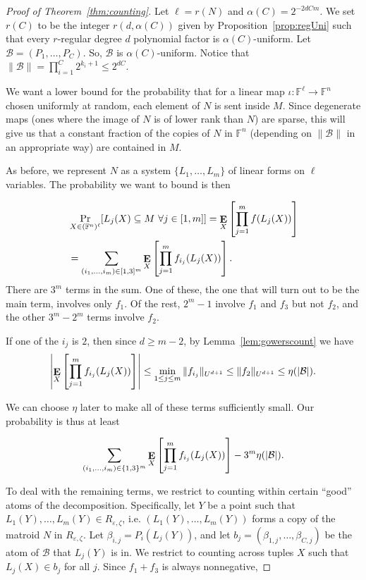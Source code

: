 \documentclass{article}
\theoremstyle{plain}
\theoremstyle{definition}
\theoremstyle{definition}
\theoremstyle{remark}
\numberwithin{equation}{section}
\newcommand{\FF}{\mathbb{F}}
\newcommand{\Esymb}{{\bf E}}
\DeclareMathOperator*{\E}{\Esymb}
\newcommand{\cB}{\mathcal B}
\begin{document}
\begin{proof}[Proof of Theorem~\ref{thm:counting}]
Let $\ell=r(N)$ and $\alpha(C)=2^{-2dCm}$. We set $r(C)$ to be the integer $r(d,\alpha(C))$ given by Proposition~\ref{prop:regUni} such that every $r$-regular degree $d$ polynomial factor is $\alpha(C)$-uniform. Let $\cB=(P_1,\dots,P_C)$. So, $\cB$ is $\alpha(C)$-uniform. Notice that $\|\cB\|=\prod_{i=1}^C 2^{k_i+1}\leq 2^{dC}$. 

We want a lower bound for the probability that for a linear map $\iota:\FF^\ell\to \FF^n$ chosen uniformly at random, each element of $N$ is sent inside $M$. Since degenerate maps (ones where the image of $N$ is of lower rank than $N$) are sparse, this will give us that a constant fraction of the copies of $N$ in $\FF^n$ (depending on $\|\cB\|$ in an appropriate way) are contained in $M$.

As before, we represent $N$ as a system $\{L_1,\dots,L_m\}$ of linear forms on $\ell$ variables. The probability we want to bound is then

\begin{align*}
    &\Pr_{X\in (\FF^{n})^\ell}[L_j(X)\subseteq M ~ \forall j \in [1,m] ]=\E_{X}\left[\prod_{j=1}^m f(L_j(X))\right]\\
    &=\sum_{(i_1,\dots,i_m)\in [1,3]^m}\E_{X}\left[\prod_{j=1}^m f_{i_j}(L_j(X))\right].
\end{align*}
There are $3^m$ terms in the sum. One of these, the one that will turn out to be the main term, involves only $f_1$. Of the rest, $2^m-1$ involve $f_1$ and $f_3$ but not $f_2$, and the other $3^m-2^m$ terms involve $f_2$.

If one of the $i_j$ is $2$, then since $d\geq m-2$, by Lemma~\ref{lem:gowerscount} we have
\[\left|\E_{X}\left[\prod_{j=1}^m f_{i_j}(L_j(X))\right]\right|\leq \min_{1\leq j\leq m} \|f_{i_j}\|_{U^{d+1}}\leq \|f_2\|_{U^{d+1}}\leq \eta(|\cB|).
\]

We can choose $\eta$ later to make all of these terms sufficiently small. Our probability is thus at least

\[\sum_{(i_1,\dots,i_m)\in \{1,3\}^m}\E_{X}\left[\prod_{j=1}^m f_{i_j}(L_j(X))\right]-3^m \eta(|\cB|).\]

To deal with the remaining terms, we restrict to counting within certain ``good'' atoms of the decomposition. Specifically, let $Y$ be a point such that $L_1(Y),\dots,L_m(Y)\in R_{\varepsilon,\zeta}$, i.e. $(L_1(Y),\dots,L_m(Y))$ forms a copy of the matroid $N$ in $R_{\varepsilon,\zeta}$. Let $\beta_{i,j}=P_i(L_j(Y))$, and let $b_j=(\beta_{1,j},\dots,\beta_{C,j})$ be the atom of $\cB$ that $L_j(Y)$ is in. We restrict to counting across tuples $X$ such that  $L_j(X)\in b_j$ for all $j$. Since $f_1+f_3$ is always nonnegative,


\end{proof}
\end{document}
